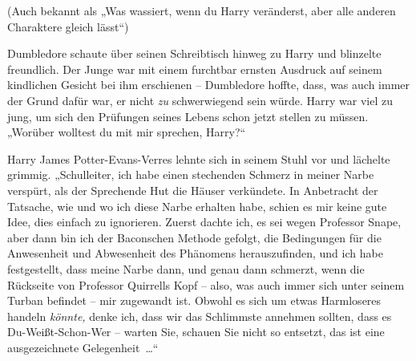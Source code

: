 (Auch bekannt als „Was wassiert, wenn du Harry veränderst, aber alle anderen Charaktere gleich lässt“)

Dumbledore schaute über seinen Schreibtisch hinweg zu Harry und blinzelte freundlich. Der Junge war mit einem furchtbar ernsten Ausdruck auf seinem kindlichen Gesicht bei ihm erschienen – Dumbledore hoffte, dass, was auch immer der Grund dafür war, er nicht \emph{zu} schwerwiegend sein würde. Harry war viel zu jung, um sich den Prüfungen seines Lebens schon jetzt stellen zu müssen. „Worüber wolltest du mit mir sprechen, Harry?“

Harry James Potter-Evans-Verres lehnte sich in seinem Stuhl vor und lächelte grimmig. „Schulleiter, ich habe einen stechenden Schmerz in meiner Narbe verspürt, als der Sprechende Hut die Häuser verkündete. In Anbetracht der Tatsache, wie und wo ich diese Narbe erhalten habe, schien es mir keine gute Idee, dies einfach zu ignorieren. Zuerst dachte ich, es sei wegen Professor Snape, aber dann bin ich der Baconschen Methode gefolgt, die Bedingungen für die Anwesenheit und Abwesenheit des Phänomens herauszufinden, und ich habe festgestellt, dass meine Narbe dann, und genau dann schmerzt, wenn die Rückseite von Professor Quirrells Kopf – also, was auch immer sich unter seinem Turban befindet – mir zugewandt ist. Obwohl es sich um etwas Harmloseres handeln \emph{könnte,} denke ich, dass wir das Schlimmste annehmen sollten, dass es Du-Weißt-Schon-Wer – warten Sie, schauen Sie nicht so entsetzt, das ist eine ausgezeichnete Gelegenheit …“






